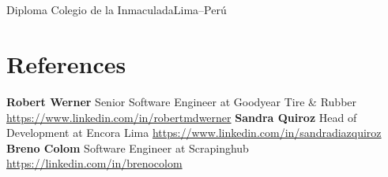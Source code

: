 \documentclass[11pt,a4paper,english]{moderncv}
\begin{document}
\subsection{}

    {Diploma}
    {Colegio de la Inmaculada}{Lima--Perú}
    {}{}

\subsection{}

\section{References}
\cvlistitem
{
    \textbf{Robert Werner}
    \newline{}
    Senior Software Engineer at Goodyear Tire \& Rubber
    \newline{}
    \url{https://www.linkedin.com/in/robertmdwerner}
}
\cvlistitem
{
    \textbf{Sandra Quiroz}
    \newline{}
    Head of Development at Encora Lima
    \newline{}
    \url{https://www.linkedin.com/in/sandradiazquiroz}
}
\cvlistitem
{
    \textbf{Breno Colom}
    \newline{}
    Software Engineer at Scrapinghub
    \newline{}
    \url{https://linkedin.com/in/brenocolom}
}
\end{document}
